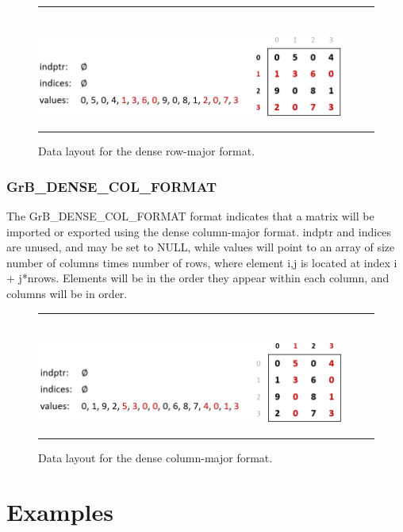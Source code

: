 \begin{figure}[h]
    \hrule
    \begin{center}
        ~\\
        \includegraphics[width=4in]{GrB_DENSE_ROW_FORMAT.png}
    \end{center}
    \vspace{-1em}
    \caption{Data layout for the dense row-major format.}
    \label{Fig:DenseRow_format}
    \hrule
\end{figure}


\subsection{{\sf GrB\_DENSE\_COL\_FORMAT}}
The {\sf GrB\_DENSE\_COL\_FORMAT} format indicates that a matrix will be imported
or exported using the dense column-major format.  {\sf indptr} and {\sf indices} are unused,
and may be set to NULL, while {\sf values} will point to an array of size number of columns
times number of rows, where element i,j is located at index i + j*nrows. Elements will be
in the order they appear within each column, and columns will be in order.

\begin{figure}[h]
    \hrule
    \begin{center}
        ~\\
        \includegraphics[width=4in]{GrB_DENSE_COLUMN_FORMAT.png}
    \end{center}
    \vspace{-1em}
    \caption{Data layout for the dense column-major format.}
    \label{Fig:DenseCol_format}
    \hrule
\end{figure}


\chapter{Examples}
\label{Chp:Examples}

